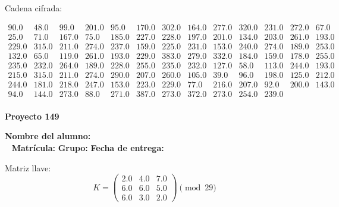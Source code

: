\documentclass[12pt]{article}
\begin{document}
Cadena cifrada:
\begin{center}
$\begin{array}{lllllllllllll}
90.0 & 48.0 & 99.0 & 201.0 & 95.0 & 170.0 & 302.0 & 164.0 & 277.0 & 320.0 & 231.0 & 272.0 & 67.0\\
25.0 & 71.0 & 167.0 & 75.0 & 185.0 & 227.0 & 228.0 & 197.0 & 201.0 & 134.0 & 203.0 & 261.0 & 193.0\\
229.0 & 315.0 & 211.0 & 274.0 & 237.0 & 159.0 & 225.0 & 231.0 & 153.0 & 240.0 & 274.0 & 189.0 & 253.0\\
132.0 & 65.0 & 119.0 & 261.0 & 193.0 & 229.0 & 383.0 & 279.0 & 332.0 & 184.0 & 159.0 & 178.0 & 255.0\\
235.0 & 232.0 & 264.0 & 189.0 & 228.0 & 255.0 & 235.0 & 232.0 & 127.0 & 58.0 & 113.0 & 244.0 & 193.0\\
215.0 & 315.0 & 211.0 & 274.0 & 290.0 & 207.0 & 260.0 & 105.0 & 39.0 & 96.0 & 198.0 & 125.0 & 212.0\\
244.0 & 181.0 & 218.0 & 247.0 & 153.0 & 223.0 & 229.0 & 77.0 & 216.0 & 207.0 & 92.0 & 200.0 & 143.0\\
94.0 & 144.0 & 273.0 & 88.0 & 271.0 & 387.0 & 273.0 & 372.0 & 273.0 & 254.0 & 239.0\\
\end{array}$
\end{center}

\newpage


\textbf{Proyecto 149}

\textbf{Nombre del alumno:} \underline{\hspace{13cm}}\\\
\vspace{1cm}
\textbf{Matrícula:} \underline{\hspace{4cm}} \hspace{1cm}
\textbf{Grupo:} \underline{\hspace{2cm}}
\textbf{Fecha de entrega:} \underline{\hspace{2cm}}

\medskip

Matriz llave:
\[
K = \begin{pmatrix}
2.0 & 4.0 & 7.0\\
6.0 & 6.0 & 5.0\\
6.0 & 3.0 & 2.0
\end{pmatrix} \pmod{29}
\]
\end{document}

